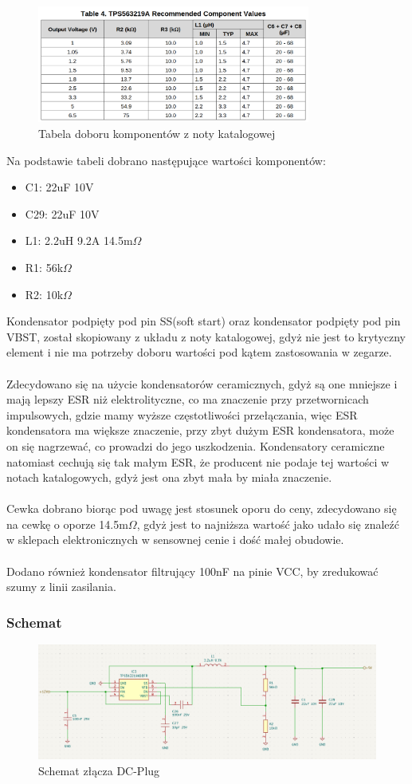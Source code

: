 \documentclass{article}
\begin{document}
\begin{figure}[H]
    \centering
    \includegraphics[width=0.8\textwidth]{conv-table.png}
    \caption{Tabela doboru komponentów z noty katalogowej}
\end{figure}

Na podstawie tabeli dobrano następujące wartości komponentów:
\begin{itemize}
    \item C1: 22uF 10V
    \item C29: 22uF 10V
    \item L1: 2.2uH 9.2A 14.5m$\Omega$
    \item R1: 56k$\Omega$
    \item R2: 10k$\Omega$
\end{itemize}

Kondensator podpięty pod pin SS(soft start) oraz kondensator podpięty pod pin VBST, został skopiowany z układu z noty katalogowej, gdyż nie jest to krytyczny element i nie ma potrzeby doboru wartości pod 
kątem zastosowania w zegarze.
\\\\
Zdecydowano się na użycie kondensatorów ceramicznych, gdyż są one mniejsze i mają lepszy ESR niż elektrolityczne, co ma znaczenie przy przetwornicach impulsowych,
gdzie mamy wyższe częstotliwości przełączania, więc ESR kondensatora ma większe znaczenie, przy zbyt dużym ESR kondensatora, może on się nagrzewać, co prowadzi do jego uszkodzenia.
Kondensatory ceramiczne natomiast cechują się tak małym ESR, że producent nie podaje tej wartości w notach katalogowych, gdyż jest ona zbyt mała by miała znaczenie.
\\\\
Cewka dobrano biorąc pod uwagę jest stosunek oporu do ceny, zdecydowano się na cewkę o oporze 14.5m$\Omega$, 
gdyż jest to najniższa wartość jako udało się znaleźć w sklepach elektronicznych w sensownej cenie i dość małej obudowie.
\\\\
Dodano również kondensator filtrujący 100nF na pinie VCC, by zredukować szumy z linii zasilania.

\subsubsection{Schemat}
\begin{figure}[H]
    \centering
    \includegraphics[width=1\textwidth]{5vTo12V_ schemat.png}
    \caption{Schemat złącza DC-Plug}
\end{figure}
\end{document}
